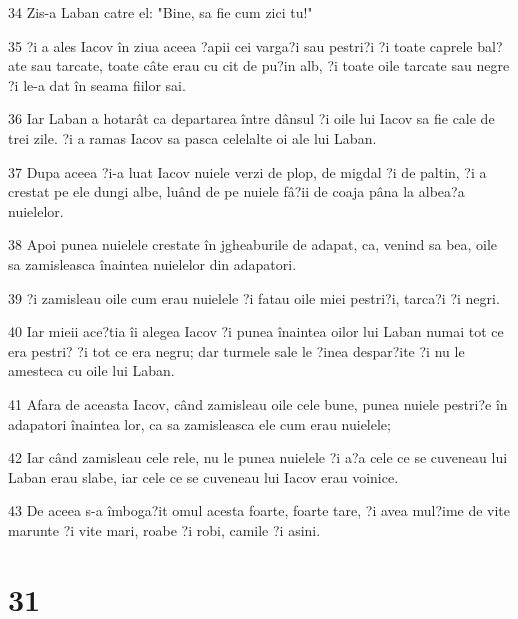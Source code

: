 \par 34 Zis-a Laban catre el: "Bine, sa fie cum zici tu!"
\par 35 ?i a ales Iacov în ziua aceea ?apii cei varga?i sau pestri?i ?i toate caprele bal?ate sau tarcate, toate câte erau cu cit de pu?in alb, ?i toate oile tarcate sau negre ?i le-a dat în seama fiilor sai.
\par 36 Iar Laban a hotarât ca departarea între dânsul ?i oile lui Iacov sa fie cale de trei zile. ?i a ramas Iacov sa pasca celelalte oi ale lui Laban.
\par 37 Dupa aceea ?i-a luat Iacov nuiele verzi de plop, de migdal ?i de paltin, ?i a crestat pe ele dungi albe, luând de pe nuiele fâ?ii de coaja pâna la albea?a nuielelor.
\par 38 Apoi punea nuielele crestate în jgheaburile de adapat, ca, venind sa bea, oile sa zamisleasca înaintea nuielelor din adapatori.
\par 39 ?i zamisleau oile cum erau nuielele ?i fatau oile miei pestri?i, tarca?i ?i negri.
\par 40 Iar mieii ace?tia îi alegea Iacov ?i punea înaintea oilor lui Laban numai tot ce era pestri? ?i tot ce era negru; dar turmele sale le ?inea despar?ite ?i nu le amesteca cu oile lui Laban.
\par 41 Afara de aceasta Iacov, când zamisleau oile cele bune, punea nuiele pestri?e în adapatori înaintea lor, ca sa zamisleasca ele cum erau nuielele;
\par 42 Iar când zamisleau cele rele, nu le punea nuielele ?i a?a cele ce se cuveneau lui Laban erau slabe, iar cele ce se cuveneau lui Iacov erau voinice.
\par 43 De aceea s-a îmboga?it omul acesta foarte, foarte tare, ?i avea mul?ime de vite marunte ?i vite mari, roabe ?i robi, camile ?i asini.

\chapter{31}


